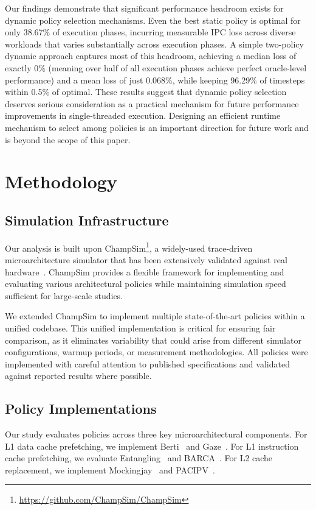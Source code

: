 \documentclass[conference]{IEEEtran}
\begin{document}
Our findings demonstrate that significant performance headroom exists for dynamic policy selection mechanisms. Even the best static policy is optimal for only 38.67\% of execution phases, incurring measurable IPC loss across diverse workloads that varies substantially across execution phases. A simple two-policy dynamic approach captures most of this headroom, achieving a median loss of exactly 0\% (meaning over half of all execution phases achieve perfect oracle-level performance) and a mean loss of just 0.068\%, while keeping 96.29\% of timesteps within 0.5\% of optimal. These results suggest that dynamic policy selection deserves serious
consideration as a practical mechanism for future performance
improvements in single-threaded execution. Designing an efficient
runtime mechanism to select among policies is an important direction
for future work and is beyond the scope of this paper.

\section{Methodology}

\subsection{Simulation Infrastructure}

Our analysis is built upon ChampSim\footnote{\url{https://github.com/ChampSim/ChampSim}}, a widely-used trace-driven microarchitecture simulator that has been extensively validated against real hardware~\cite{gober2022championship}. ChampSim provides a flexible framework for implementing and evaluating various architectural policies while maintaining simulation speed sufficient for large-scale studies.

We extended ChampSim to implement multiple state-of-the-art policies within a unified codebase. This unified implementation is critical for ensuring fair comparison, as it eliminates variability that could arise from different simulator configurations, warmup periods, or measurement methodologies. All policies were implemented with careful attention to published specifications and validated against reported results where possible.

\subsection{Policy Implementations}

Our study evaluates policies across three key microarchitectural components. 
For L1 data cache prefetching, we implement Berti~\cite{navarro2022berti} and Gaze~\cite{chen2025gaze}. 
For L1 instruction cache prefetching, we evaluate Entangling~\cite{ros2021cost} and BARCA~\cite{gratz2020barca}. 
For L2 cache replacement, we implement Mockingjay~\cite{shah2022effective} and PACIPV~\cite{mostofi2025light}.
\end{document}
